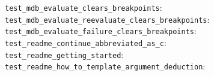 \begin{description}
    \item[\texttt{test\_mdb\_evaluate\_clears\_breakpoints}:]
    \item[\texttt{test\_mdb\_evaluate\_reevaluate\_clears\_breakpoints}:]
    \item[\texttt{test\_mdb\_evaluate\_failure\_clears\_breakpoints}:]
    \item[\texttt{test\_readme\_continue\_abbreviated\_as\_c}:]
    \item[\texttt{test\_readme\_getting\_started}:]
    \item[\texttt{test\_readme\_how\_to\_template\_argument\_deduction}:]
\end{description}

